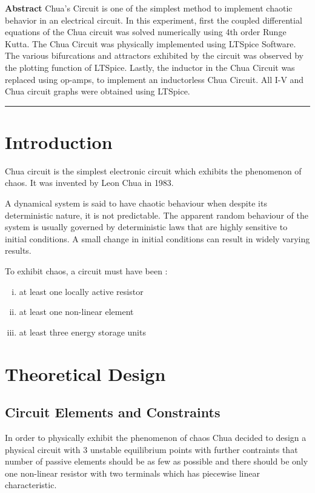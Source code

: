\documentclass[12pt]{article}
\begin{document}
\newpage
{}
\begin{center}
	\doublespacing
	\textbf{\Large Abstract} \linebreak
	Chua's Circuit is one of the simplest method to implement chaotic behavior in an electrical circuit. In this experiment, first the coupled differential equations of the Chua circuit was solved numerically using 4th order Runge Kutta. The Chua Circuit was physically implemented using LTSpice Software. The various bifurcations and attractors exhibited by the circuit was observed by the plotting function of LTSpice. Lastly, the inductor in the Chua Circuit was replaced using op-amps, to implement an inductorless Chua Circuit. All I-V and Chua circuit graphs were obtained using LTSpice.
\end{center}
\rule{17cm}{1pt}

\section{Introduction}
Chua circuit is the simplest electronic circuit which exhibits the phenomenon of chaos. It was invented by Leon Chua in 1983.
\linebreak

A dynamical system is said to have chaotic behaviour when despite its deterministic nature, it is not predictable. The apparent random behaviour of the system is usually governed by deterministic laws that are highly sensitive to initial conditions. A small change in initial conditions can result in widely varying results.
\linebreak

To exhibit chaos, a circuit must have been :
\begin{enumerate}[i.)]
	\item at least one locally active resistor
	\item at least one non-linear element
	\item at least three energy storage units
\end{enumerate}
\section{Theoretical Design}
\subsection{Circuit Elements and Constraints}
In order to physically exhibit the phenomenon of chaos Chua decided to design a physical circuit with 3 unstable equilibrium points with further contraints that number of passive elements should be as few as possible and there should be only one non-linear resistor with two terminals which has piecewise linear characteristic. \linebreak
\end{document}
